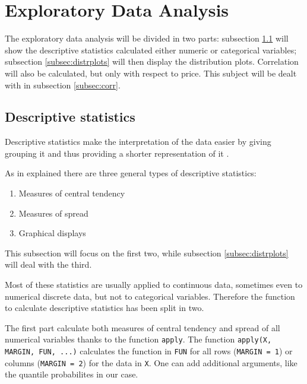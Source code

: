 \section{Exploratory Data Analysis}\label{Sec:Exploratory}

The exploratory data analysis will be divided in two parts: subsection \ref{subsec:descriptive} will show the descriptive statistics calculated either numeric or categorical variables; subsection \ref{subsec:distrplots} will then display the distribution plots. 
Correlation will also be calculated, but only with respect to price. This subject will be dealt with in subsection \ref{subsec:corr}.

\subsection{Descriptive statistics}\label{subsec:descriptive}

Descriptive statistics make the interpretation of the data easier by giving grouping it and thus providing a shorter representation of it \citep{descrstat:2014}.

As in \cite{descrstat:2014} explained there are three general types of descriptive statistics:
\begin{enumerate}
\item Measures of central tendency
\item Measures of spread
\item Graphical displays
\end{enumerate}

This subsection will focus on the first two, while subsection 
\ref{subsec:distrplots} will deal with the third.

Most of these statistics are usually applied to continuous data, sometimes even to numerical discrete data, but not to categorical variables. Therefore the function to calculate descriptive statistics has been split in two.

The first part calculate both measures of central tendency and spread of all numerical variables thanks to the function \texttt{apply}. The function \texttt{apply(X, MARGIN, FUN, ...)} calculates the function in \texttt{FUN} for all rows (\texttt{MARGIN = 1}) or columns (\texttt{MARGIN = 2}) for the data in \texttt{X}. One can add additional arguments, like the quantile probabilites in our case.




